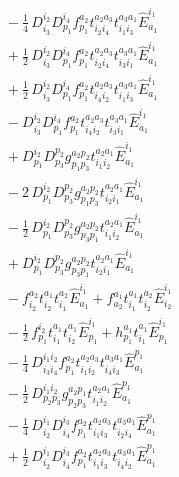 \documentclass[11pt]{article}
\begin{document}
\begin{align}
&\quad - \tfrac{1}{4}\, D^{i_{2}}_{i_{3}} D^{i_{4}}_{p_{1}} f^{a_{2}}_{p_{1}} t^{a_{2}a_{3}}_{i_{2}i_{4}} t^{a_{3}a_{1}}_{i_{1}i_{3}} \hat{E}^{i_{1}}_{a_{1}} \\
&\quad + \tfrac{1}{2}\, D^{i_{2}}_{i_{3}} D^{i_{4}}_{p_{1}} f^{a_{2}}_{p_{1}} t^{a_{2}a_{3}}_{i_{2}i_{4}} t^{a_{3}a_{1}}_{i_{3}i_{1}} \hat{E}^{i_{1}}_{a_{1}} \\
&\quad + \tfrac{1}{2}\, D^{i_{2}}_{i_{3}} D^{i_{4}}_{p_{1}} f^{a_{2}}_{p_{1}} t^{a_{2}a_{3}}_{i_{4}i_{2}} t^{a_{3}a_{1}}_{i_{1}i_{3}} \hat{E}^{i_{1}}_{a_{1}} \\
&\quad - D^{i_{2}}_{i_{3}} D^{i_{4}}_{p_{1}} f^{a_{2}}_{p_{1}} t^{a_{2}a_{3}}_{i_{4}i_{2}} t^{a_{3}a_{1}}_{i_{3}i_{1}} \hat{E}^{i_{1}}_{a_{1}} \\
&\quad + D^{i_{2}}_{p_{1}} D^{p_{2}}_{p_{3}} g^{a_{2}p_{2}}_{p_{1}p_{3}} t^{a_{2}a_{1}}_{i_{1}i_{2}} \hat{E}^{i_{1}}_{a_{1}} \\
&\quad - 2\, D^{i_{2}}_{p_{1}} D^{p_{2}}_{p_{3}} g^{a_{2}p_{2}}_{p_{1}p_{3}} t^{a_{2}a_{1}}_{i_{2}i_{1}} \hat{E}^{i_{1}}_{a_{1}} \\
&\quad - \tfrac{1}{2}\, D^{i_{2}}_{p_{1}} D^{p_{2}}_{p_{3}} g^{a_{2}p_{2}}_{p_{3}p_{1}} t^{a_{2}a_{1}}_{i_{1}i_{2}} \hat{E}^{i_{1}}_{a_{1}} \\
&\quad + D^{i_{2}}_{p_{1}} D^{p_{2}}_{p_{3}} g^{a_{2}p_{2}}_{p_{3}p_{1}} t^{a_{2}a_{1}}_{i_{2}i_{1}} \hat{E}^{i_{1}}_{a_{1}} \\
&\quad - f^{a_{2}}_{i_{2}} t^{a_{1}}_{i_{2}} t^{a_{2}}_{i_{1}} \hat{E}^{i_{1}}_{a_{1}} + f^{a_{1}}_{a_{2}} t^{a_{1}}_{i_{1}} t^{a_{2}}_{i_{2}} \hat{E}^{i_{1}}_{i_{2}} \\
&\quad - \tfrac{1}{2}\, f^{i_{2}}_{p_{1}} t^{a_{1}}_{i_{1}} t^{a_{1}}_{i_{2}} \hat{E}^{i_{1}}_{p_{1}} + h^{a_{1}}_{p_{1}} t^{a_{1}}_{i_{1}} \hat{E}^{i_{1}}_{p_{1}} \\
&\quad - \tfrac{1}{4}\, D^{i_{1}i_{2}}_{i_{3}i_{4}} f^{a_{2}}_{p_{1}} t^{a_{2}a_{3}}_{i_{1}i_{2}} t^{a_{3}a_{1}}_{i_{4}i_{3}} \hat{E}^{p_{1}}_{a_{1}} \\
&\quad - \tfrac{1}{2}\, D^{i_{1}i_{2}}_{p_{2}p_{3}} g^{a_{2}p_{1}}_{p_{2}p_{3}} t^{a_{2}a_{1}}_{i_{1}i_{2}} \hat{E}^{p_{1}}_{a_{1}} \\
&\quad - \tfrac{1}{4}\, D^{i_{1}}_{i_{2}} D^{i_{3}}_{i_{4}} f^{a_{2}}_{p_{1}} t^{a_{2}a_{3}}_{i_{1}i_{3}} t^{a_{3}a_{1}}_{i_{2}i_{4}} \hat{E}^{p_{1}}_{a_{1}} \\
&\quad + \tfrac{1}{2}\, D^{i_{1}}_{i_{2}} D^{i_{3}}_{i_{4}} f^{a_{2}}_{p_{1}} t^{a_{2}a_{3}}_{i_{1}i_{3}} t^{a_{3}a_{1}}_{i_{4}i_{2}} \hat{E}^{p_{1}}_{a_{1}} \\

\end{align}
\end{document}
